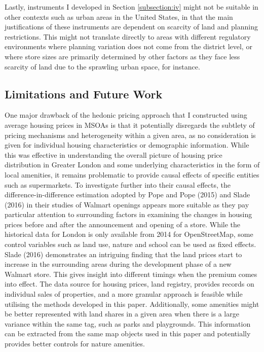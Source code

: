 \documentclass{article}
\begin{document}
Lastly, instruments I developed in Section \ref{subsection:iv} might not be suitable in other contexts such as urban areas in the United States, in that the main justifications of these instruments are dependent on scarcity of land and planning restrictions. This might not translate directly to areas with different regulatory environments where planning variation does not come from the district level, or where store sizes are primarily determined by other factors as they face less scarcity of land due to the sprawling urban space, for instance.

\subsection{Limitations and Future Work}  \label{subsection:limitations}
One major drawback of the hedonic pricing approach that I constructed using average housing prices in MSOAs is that it potentially disregards the subtlety of pricing mechanisms and heterogeneity within a given area, as no consideration is given for individual housing characteristics or demographic information. While this was effective in understanding the overall picture of housing price distribution in Greater London and some underlying characteristics in the form of local amenities, it remains problematic to provide causal effects of specific entities such as supermarkets. To investigate further into their causal effects, the difference-in-difference estimation adopted by Pope and Pope (2015) and Slade (2016) in their studies of Walmart openings appears more suitable as they pay particular attention to surrounding factors in examining the changes in housing prices before and after the announcement and opening of a store. While the historical data for London is only available from 2014 for OpenStreetMap, some control variables such as land use, nature and school can be used as fixed effects. Slade (2016) demonstrates an intriguing finding that the land prices start to increase in the surrounding areas during the development phase of a new Walmart store. This gives insight into different timings when the premium comes into effect. The data source for housing prices, land registry, provides records on individual sales of properties, and a more granular approach 
is feasible while utilising the methods developed in this paper. Additionally, some amenities might be better represented with land shares in a given area when there is a large variance within the same tag, such as parks and playgrounds. This information can be extracted from the same map objects used in this paper and potentially provides better controls for nature amenities. 
\end{document}
